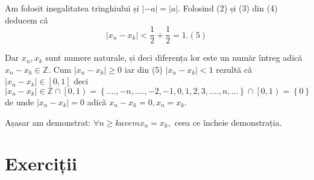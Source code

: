 \documentclass[a4paper,12pt,oneside]{report}
\begin{document}
Am folosit inegalitatea tringhiului și \(\left | -a \right |= \left | a \right |\). Folosind (2) și (3) din (4) deducem că 
\begin{displaymath}
  \left | x_{n}-x_{k} \right |< \frac{1}{2}+ \frac{1}{2}= 1. (5) 
\end{displaymath}


Dar \(x_{n}, x_{k}\) sunt numere naturale, și deci diferența lor este un număr întreg adică \(x_{n}- x_{k}\in \mathbb{Z}\). Cum \(\left |x_{n}- x_{k} \right |\geq 0\) iar din (5) \(\left |x_{n}- x_{k} \right |< 1\) rezultă că \(\left |x_{n}- x_{k} \right |\in \left [ 0,1 \right ]\) deci \(\left |x_{n}- x_{k} \right |\in\mathbb{Z}\cap \left [ 0,1 \right)= \left \{ ....,-n ,....,-2,-1,0,1,2,3,....,n,... \right \}\cap \left [ 0,1 \right )= \left \{ 0 \right \}\) de unde \(\left | x_{n}-x_{k} \right |=0\) adică \(x_{n}-x_{k}=0,x_{n}=x_{k}.\) 

Așasar am demonstrat: \(\forall n\geq k avem x_{n}=x_{k},\) ceea ce încheie demonstrația. 

\section{Exerciții}
\end{document}
